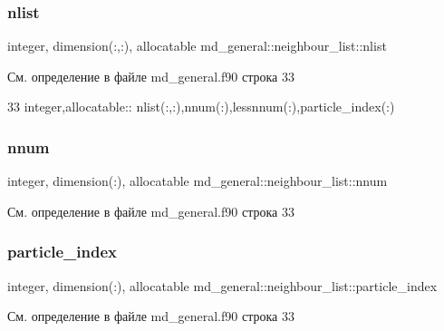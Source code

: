 \subsubsection{\texorpdfstring{nlist}{nlist}}
{\footnotesize\ttfamily integer, dimension(\+:,\+:), allocatable md\+\_\+general\+::neighbour\+\_\+list\+::nlist}



См. определение в файле md\+\_\+general.\+f90 строка 33


\begin{DoxyCode}
33     \textcolor{keywordtype}{integer},\textcolor{keywordtype}{allocatable}:: nlist(:,:),nnum(:),lessnnum(:),particle\_index(:)
\end{DoxyCode}
\mbox{\label{structmd__general_1_1neighbour__list_ae6525e2a9309928e7cdf74d4b5f23016}} 
\subsubsection{\texorpdfstring{nnum}{nnum}}
{\footnotesize\ttfamily integer, dimension(\+:), allocatable md\+\_\+general\+::neighbour\+\_\+list\+::nnum}



См. определение в файле md\+\_\+general.\+f90 строка 33

\mbox{\label{structmd__general_1_1neighbour__list_ae009b5d034f5fc26f2f425b6968699e1}} 
\subsubsection{\texorpdfstring{particle\+\_\+index}{particle\_index}}
{\footnotesize\ttfamily integer, dimension(\+:), allocatable md\+\_\+general\+::neighbour\+\_\+list\+::particle\+\_\+index}



См. определение в файле md\+\_\+general.\+f90 строка 33

\mbox{\label{structmd__general_1_1neighbour__list_a6ed9510d3ad2c58c70c4446a74dd5974}} 
